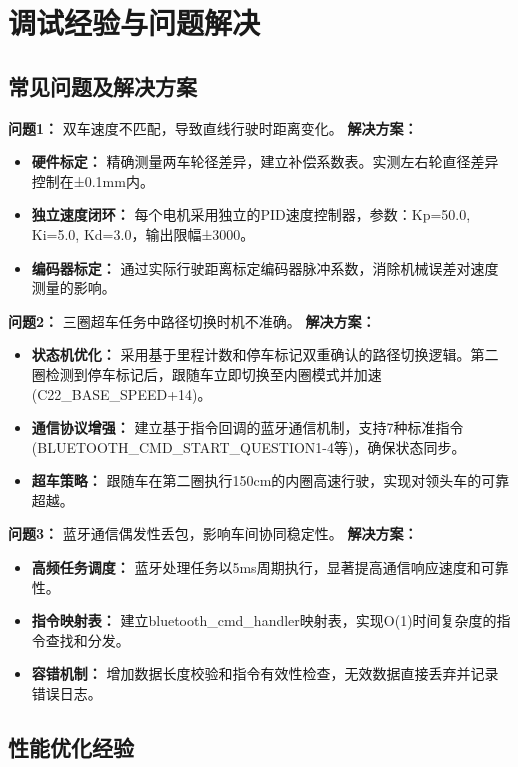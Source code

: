 \documentclass[UTF8]{ctexart}
\begin{document}
\section{调试经验与问题解决}

\subsection{常见问题及解决方案}

\textbf{问题1：} 双车速度不匹配，导致直线行驶时距离变化。
\textbf{解决方案：}
\begin{itemize}
    \item \textbf{硬件标定：} 精确测量两车轮径差异，建立补偿系数表。实测左右轮直径差异控制在±0.1mm内。
    \item \textbf{独立速度闭环：} 每个电机采用独立的PID速度控制器，参数：Kp=50.0, Ki=5.0, Kd=3.0，输出限幅±3000。
    \item \textbf{编码器标定：} 通过实际行驶距离标定编码器脉冲系数，消除机械误差对速度测量的影响。
\end{itemize}

\textbf{问题2：} 三圈超车任务中路径切换时机不准确。
\textbf{解决方案：}
\begin{itemize}
    \item \textbf{状态机优化：} 采用基于里程计数和停车标记双重确认的路径切换逻辑。第二圈检测到停车标记后，跟随车立即切换至内圈模式并加速(C22\_BASE\_SPEED+14)。
    \item \textbf{通信协议增强：} 建立基于指令回调的蓝牙通信机制，支持7种标准指令(BLUETOOTH\_CMD\_START\_QUESTION1-4等)，确保状态同步。
    \item \textbf{超车策略：} 跟随车在第二圈执行150cm的内圈高速行驶，实现对领头车的可靠超越。
\end{itemize}

\textbf{问题3：} 蓝牙通信偶发性丢包，影响车间协同稳定性。
\textbf{解决方案：}
\begin{itemize}
    \item \textbf{高频任务调度：} 蓝牙处理任务以5ms周期执行，显著提高通信响应速度和可靠性。
    \item \textbf{指令映射表：} 建立bluetooth\_cmd\_handler映射表，实现O(1)时间复杂度的指令查找和分发。
    \item \textbf{容错机制：} 增加数据长度校验和指令有效性检查，无效数据直接丢弃并记录错误日志。
\end{itemize}

\subsection{性能优化经验}
\end{document}
